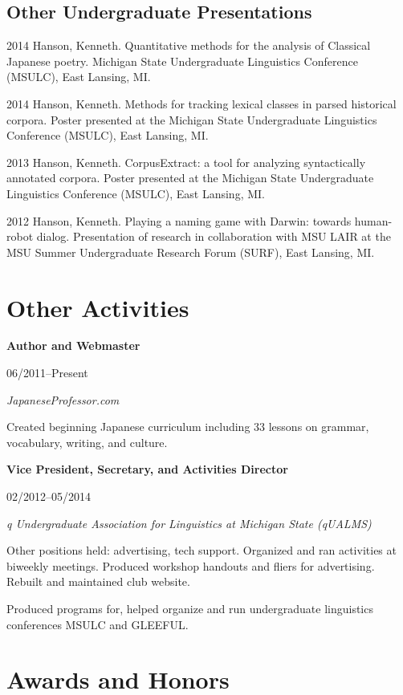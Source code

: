 \documentclass[10pt,oneside]{article}
\newcommand{\ressection}[1]{
	\vspace{-12pt}
	\section*{#1}
}
\newcommand{\ressubsection}[1]{
	\subsection*{#1}
	\vspace{-4pt}
}
\newcommand{\resbigitem}[4]{
	\item \parbox[t]{0.8\textwidth}{\textbf{#1}} \hfill #2 \\
		\parbox[t]{0.8\textwidth}{\textit{#3}} \hfill \textit{#4}
}
\begin{document}
\ressubsection{Other Undergraduate Presentations}
\begin{publist}
	\item[2014] {Hanson, Kenneth. Quantitative methods for the analysis of Classical Japanese poetry. Michigan State Undergraduate Linguistics Conference (MSULC), East Lansing, MI.}
	
	\item[2014] {Hanson, Kenneth. Methods for tracking lexical classes in parsed historical corpora. Poster presented at the Michigan State Undergraduate Linguistics Conference (MSULC), East Lansing, MI.}
	
	\item[2013] {Hanson, Kenneth. CorpusExtract: a tool for analyzing syntactically annotated corpora. Poster presented at the Michigan State Undergraduate Linguistics Conference (MSULC), East Lansing, MI.}
	
	\item[2012] {Hanson, Kenneth. Playing a naming game with Darwin: towards human-robot dialog. Presentation of research in collaboration with MSU LAIR at the MSU Summer Undergraduate Research Forum (SURF), East Lansing, MI.}
\end{publist}


\ressection{Other Activities}

\begin{reslist}
	\resbigitem{Author and Webmaster}
		{06/2011--Present}
		{JapaneseProfessor.com}
		{}
	\begin{reslist}
		\item Created beginning Japanese curriculum including 33 lessons on grammar, vocabulary, writing, and culture.
	\end{reslist}
	
	\resbigitem{Vice President, Secretary, and Activities Director}
		{02/2012--05/2014}
		{q Undergraduate Association for Linguistics at Michigan State (qUALMS)}
		{}
	\begin{reslist}
		\item Other positions held: advertising, tech support. Organized and ran activities at biweekly meetings. Produced workshop handouts and fliers for advertising. Rebuilt and maintained club website.
		\item Produced programs for, helped organize and run undergraduate linguistics conferences MSULC and GLEEFUL. 
	\end{reslist}
\end{reslist}


\ressection{Awards and Honors}
	
\end{document}
